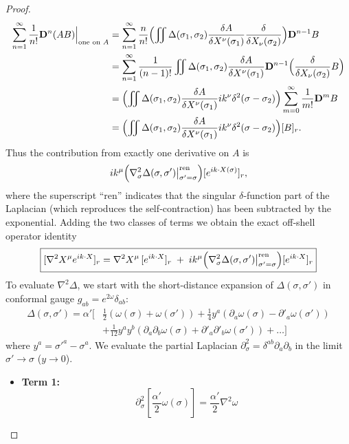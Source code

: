\begin{tcolorbox}[breakable]
\begin{proof}
\begin{align}
				\sum_{n=1}^{\infty} \frac{1}{n!} \mathbf{D}^n (A B) \Big|_{\text{one on }A} 
				&= \sum_{n=1}^{\infty} \frac{n}{n!} \Bigl( \iint \Delta(\sigma_1,\sigma_2) \frac{\delta A}{\delta X^\nu(\sigma_1)} \frac{\delta}{\delta X_\nu(\sigma_2)} \Bigr) \mathbf{D}^{n-1} B \nonumber\\
				&= \sum_{n=1}^{\infty} \frac{1}{(n-1)!} \iint \Delta(\sigma_1,\sigma_2) \frac{\delta A}{\delta X^\nu(\sigma_1)} \mathbf{D}^{n-1} \Bigl(\frac{\delta}{\delta X_\nu(\sigma_2)}  B \Bigr) \nonumber\\
				&= \Bigl( \iint \Delta(\sigma_1,\sigma_2) \frac{\delta A}{\delta X^\nu(\sigma_1)} i k^\nu \delta^2(\sigma-\sigma_2) \Bigr) \sum_{m=0}^{\infty} \frac{1}{m!} \mathbf{D}^m B \nonumber\\
				&= \Bigl( \iint \Delta(\sigma_1,\sigma_2) \frac{\delta A}{\delta X^\nu(\sigma_1)} i k^\nu \delta^2(\sigma-\sigma_2)\Bigr) [B]_r.
			\end{align}
			Thus the contribution from exactly one derivative on $A$ is
			\begin{equation}
				i k^\mu \Bigl( \nabla^2_\sigma \Delta(\sigma,\sigma') \big|_{\sigma'=\sigma}^{\text{ren}} \Bigr) [e^{ik\cdot X(\sigma)}]_r,
			\end{equation}
			where the superscript ``ren'' indicates that the singular $\delta$‑function part of the Laplacian (which reproduces the self‑contraction) has been subtracted by the exponential. Adding the two classes of terms we obtain the exact off‑shell operator identity
			\begin{equation}
				\boxed{ [\nabla^2 X^\mu e^{ik\cdot X}]_r = \nabla^2 X^\mu \,[e^{ik\cdot X}]_r \;+\; i k^\mu \Bigl( \nabla^2_\sigma \Delta(\sigma,\sigma') \big\lvert_{\sigma'=\sigma}^{\text{ren}} \Bigr) [e^{ik\cdot X}]_r } \label{dagger}
			\end{equation}
			To evaluate $\nabla^2\Delta$, we start with the short-distance expansion of $\Delta(\sigma, \sigma')$ in conformal gauge $g_{ab} = e^{2\omega} \delta_{ab}$:
			\begin{align*}
				\Delta(\sigma, \sigma') = \alpha' \bigg[ &\frac{1}{2}(\omega(\sigma) + \omega(\sigma')) + \frac{1}{4} y^a (\partial_a \omega(\sigma) - \partial'_a \omega(\sigma')) \\
				&+ \frac{1}{12} y^a y^b (\partial_a \partial_b \omega(\sigma) + \partial'_a \partial'_b \omega(\sigma')) + \dots \bigg]
			\end{align*}
			where $y^a = \sigma'^a - \sigma^a$. We evaluate the partial Laplacian $\partial^2_\sigma = \delta^{ab} \partial_a \partial_b$ in the limit $\sigma' \to \sigma$ ($y \to 0$).
			\begin{itemize}
				\item \textbf{Term 1:}
				\[ \partial^2_\sigma \left[ \frac{\alpha'}{2} \omega(\sigma) \right] = \frac{\alpha'}{2} \nabla^2 \omega \]
				

\end{itemize}
\end{proof}
\end{tcolorbox}
